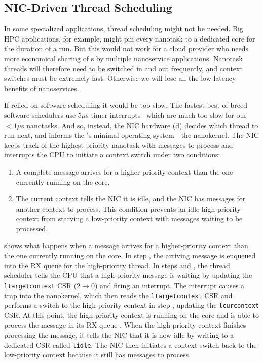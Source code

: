 \subsection{NIC-Driven Thread Scheduling}
\label{ssec:thread-scheduler}
In some specialized applications, thread scheduling might not be needed. Big HPC applications, for example, might pin every nanotask to a dedicated core for the duration of a run. But this would not work for a cloud provider who needs more economical sharing of \name{}s by multiple nanoservice applications.
Nanotask threads will therefore need to be switched in and out frequently, and context switches must be extremely fast. Otherwise we will lose all the low latency benefits of nanoservices.

If \name{} relied on software scheduling it would be too slow. 
The fastest best-of-breed software schedulers use 5$\mu$s timer interrupts~\cite{shinjuku, shenango} which are much too slow for our $<1\mu$s nanotasks.
And so, instead, the NIC hardware (d) decides which thread to run next, and informs the \name{}'s minimal operating system---the nanokernel. 
The NIC keeps track of the highest-priority nanotask with messages to process and interrupts the CPU to initiate a context switch under two conditions:

\begin{enumerate}[topsep=0.4\baselineskip, leftmargin=20pt]
    \item A complete message arrives for a higher priority context than the one currently running on the core.
    \item The current context tells the NIC it is idle, and the NIC has messages for another context to process. 
    This condition prevents an idle high-priority context from starving a low-priority context with messages waiting to be processed.
\end{enumerate}

 shows what happens when a message arrives for a higher-priority context than the one currently running on the core. 
In step , the arriving message is enqueued into the RX queue for the high-priority thread.
In steps  and , the thread scheduler tells the CPU that a high-priority message is waiting by updating the \verb|ltargetcontext| CSR ($2\rightarrow 0$) and firing an interrupt.
The interrupt causes a trap into the nanokernel, which then reads the \verb|ltargetcontext| CSR and performs a switch to the high-priority context in step , updating the \verb|lcurcontext| CSR.
At this point, the high-priority context is running on the core and is able to process the message in its RX queue .
When the high-priority context finishes processing the message, it tells the NIC that it is now idle by writing to a dedicated CSR called \verb|lidle|.
The NIC then initiates a context switch back to the low-priority context because it still has messages to process.

